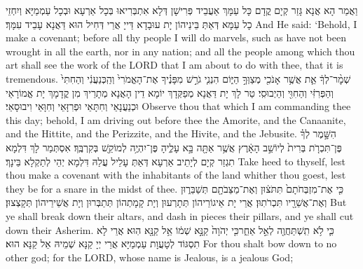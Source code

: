 {{}
{וַאֲמַר הָא אֲנָא גָּזַר קְיָם קֳדָם כָּל עַמָּךְ אַעֲבֵיד פְּרִישָׁן דְּלָא אִתְבְּרִיאוּ בְּכָל אַרְעָא וּבְכָל עַמְמַיָּא וְיִחְזֵי כָל עַמָּא דְּאַתְּ בֵּינֵיהוֹן יָת עוּבָדָא דַּייָ אֲרֵי דְּחִיל הוּא דַּאֲנָא עָבֵיד עִמָּךְ׃}
{And He said: ‘Behold, I make a covenant; before all thy people I will do marvels, such as have not been wrought in all the earth, nor in any nation; and all the people among which thou art shall see the work of the LORD that I am about to do with thee, that it is tremendous.}{}
{שְׁמׇ֨ר־לְךָ֔ אֵ֛ת אֲשֶׁ֥ר אָנֹכִ֖י מְצַוְּךָ֣ הַיּ֑וֹם הִנְנִ֧י גֹרֵ֣שׁ מִפָּנֶ֗יךָ אֶת־הָאֱמֹרִי֙ וְהַֽכְּנַעֲנִ֔י וְהַחִתִּי֙ וְהַפְּרִזִּ֔י וְהַחִוִּ֖י וְהַיְבוּסִֽי׃
}
{טַר לָךְ יָת דַּאֲנָא מְפַקְּדָךְ יוֹמָא דֵין הָאֲנָא מְתָרֵיךְ מִן קֳדָמָךְ יָת אֱמוֹרָאֵי וּכְנַעֲנָאֵי וְחִתָּאֵי וּפְרִזָּאֵי וְחִוָּאֵי וִיבוּסָאֵי׃}
{Observe thou that which I am commanding thee this day; behold, I am driving out before thee the Amorite, and the Canaanite, and the Hittite, and the Perizzite, and the Hivite, and the Jebusite.}{}
{הִשָּׁ֣מֶר לְךָ֗ פֶּן־תִּכְרֹ֤ת בְּרִית֙ לְיוֹשֵׁ֣ב הָאָ֔רֶץ אֲשֶׁ֥ר אַתָּ֖ה בָּ֣א עָלֶ֑יהָ פֶּן־יִהְיֶ֥ה לְמוֹקֵ֖שׁ בְּקִרְבֶּֽךָ׃}
{אִסְתְּמַר לָךְ דִּלְמָא תִגְזַר קְיָם לְיָתֵיב אַרְעָא דְּאַתְּ עָלֵיל עֲלַהּ דִּלְמָא יְהֵי לְתַקְלָא בֵּינָךְ׃}
{Take heed to thyself, lest thou make a covenant with the inhabitants of the land whither thou goest, lest they be for a snare in the midst of thee.}{}
{כִּ֤י אֶת־מִזְבְּחֹתָם֙ תִּתֹּצ֔וּן וְאֶת־מַצֵּבֹתָ֖ם תְּשַׁבֵּר֑וּן וְאֶת־אֲשֵׁרָ֖יו תִּכְרֹתֽוּן׃
}
{אֲרֵי יָת אֵיגוֹרֵיהוֹן תְּתָרְעוּן וְיָת קָמָתְהוֹן תְּתַבְּרוּן וְיָת אֲשֵׁירֵיהוֹן תְּקָצְצוּן׃}
{But ye shall break down their altars, and dash in pieces their pillars, and ye shall cut down their Asherim.}{}
{כִּ֛י לֹ֥א תִֽשְׁתַּחֲוֶ֖ה לְאֵ֣ל אַחֵ֑\large ר\normalsize  כִּ֤י יְהֹוָה֙ קַנָּ֣א שְׁמ֔וֹ אֵ֥ל קַנָּ֖א הֽוּא׃
}
{אֲרֵי לָא תִסְגּוֹד לְטָעֲוָת עַמְמַיָּא אֲרֵי יְיָ קַנָּא שְׁמֵיהּ אֵל קַנָּא הוּא׃}
{For thou shalt bow down to no other god; for the LORD, whose name is Jealous, is a jealous God;}{}
}
